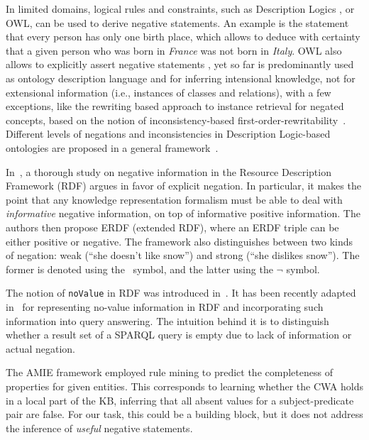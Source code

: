 In limited domains, logical rules and constraints, such as Description Logics \cite{logichandbook}, \cite{Calvanese2007} or OWL, can be used to derive negative statements. An example is the statement that every person has only one birth place, which allows to deduce with certainty that a given person who was born in \textit{France} was not born in \textit{Italy}. OWL also allows to explicitly assert negative statements \cite{mcguinness2004owl}, yet so far is predominantly used as ontology description language and for inferring intensional knowledge, not for extensional information (i.e., instances of classes and relations), with a few exceptions, like the rewriting based approach to instance retrieval for negated concepts, based on the notion of inconsistency-based first-order-rewritability~\cite{DuPa2015}. Different levels of negations and inconsistencies in Description Logic-based ontologies are proposed in a general framework~\cite{FHPPW2006}.

In~\cite{DBLP:journals/amai/AnalytiADP13,Analyti04negationand}, a thorough study on negative information in the Resource Description Framework (RDF) argues in favor of explicit negation. In particular, it makes the point that any knowledge representation formalism must be able to deal with \textit{informative} negative information, on top of informative positive information. The authors then propose ERDF (extended RDF), where an ERDF triple can be either positive or negative. The framework also distinguishes between two kinds of negation: weak (``she doesn't like snow'') and strong (``she dislikes snow''). The former is denoted using the \textapprox \   symbol, and the latter using the $\neg$ symbol.

The notion of \texttt{noValue} in RDF was introduced in~\cite{DBLP:books/aw/AbiteboulHV95}. It has been recently adapted in~\cite{DBLP:conf/semweb/DarariPN15} for representing no-value information in RDF and incorporating such information into query answering. The intuition behind it is to distinguish whether a result set of a SPARQL query is empty due to lack of information or actual negation.

The AMIE framework \cite{galarraga2017predicting} employed rule mining to predict the completeness of properties for given entities. This corresponds to learning  whether the CWA holds in a local part of the KB, inferring that all absent values for a subject-predicate pair are false. For our task, this could be a building block, but it does not address the inference of {\em useful} negative statements.

